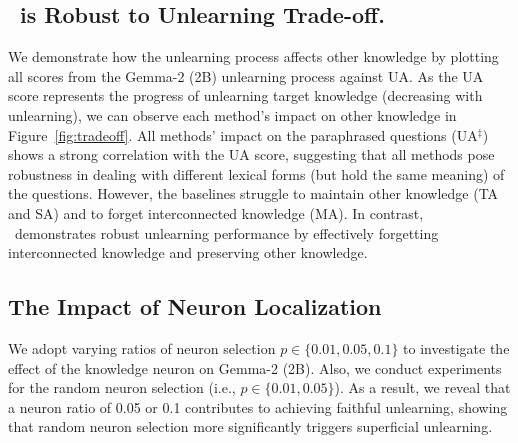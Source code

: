 \subsection{\ourmodel~is Robust to Unlearning Trade-off.}
We demonstrate how the unlearning process affects other knowledge by plotting all scores from the Gemma-2 (2B) unlearning process against UA.
As the UA score represents the progress of unlearning target knowledge (decreasing with unlearning), we can observe each method's impact on other knowledge in Figure~\ref{fig:tradeoff}.
All methods' impact on the paraphrased questions (UA$^\ddag$) shows a strong correlation with the UA score, suggesting that all methods pose robustness in dealing with different lexical forms (but hold the same meaning) of the questions. 
However, the baselines struggle to maintain other knowledge (TA and SA) and to forget interconnected knowledge (MA).
In contrast, \ourmodel~demonstrates robust unlearning performance by effectively forgetting interconnected knowledge and preserving other knowledge.














\subsection{The Impact of Neuron Localization}
\label{exp:ratio_neuron}
We adopt varying ratios of neuron selection $p \in \{0.01, 0.05, 0.1\}$ to investigate the effect of the knowledge neuron on Gemma-2 (2B).
Also, we conduct experiments for the random neuron selection (i.e., $p \in \{0.01, 0.05\}$).
As a result, we reveal that a neuron ratio of 0.05 or 0.1 contributes to achieving faithful unlearning, showing that random neuron selection more significantly triggers superficial unlearning.


